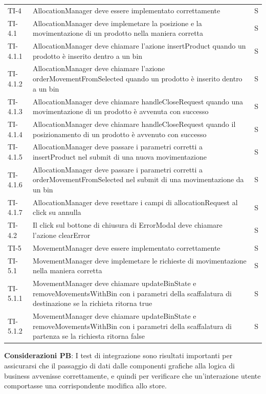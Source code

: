 \begin{xltabular}{0.9\textwidth}{X | p{0.6\textwidth}  | p{0.1\textwidth}}
    TI-4 & AllocationManager deve essere implementato correttamente & S\\
    TI-4.1 & AllocationManager deve implemetare la posizione e la movimentazione di un prodotto nella maniera corretta & S\\
    TI-4.1.1 & AllocationManager deve chiamare l'azione insertProduct quando un prodotto è inserito dentro a un bin & S\\
    TI-4.1.2 & AllocationManager deve chiamare l'azione orderMovementFromSelected quando un prodotto è inserito dentro a un bin & S\\
    TI-4.1.3 & AllocationManager deve chiamare handleCloseRequest quando una movimentazione di un prodotto è avvenuta con successo  & S\\
    TI-4.1.4 & AllocationManager deve chiamare handleCloseRequest quando il posizionamento di un prodotto è avvenuto con successo & S\\
    TI-4.1.5 & AllocationManager deve passare i parametri corretti a insertProduct nel submit di una nuova movimentazione & S\\
    TI-4.1.6 & AllocationManager deve passare i parametri corretti a orderMovementFromSelected nel submit di una movimentazione da un bin & S\\
    TI-4.1.7 & AllocationManager deve resettare i campi di allocationRequest al click su annulla & S\\
    TI-4.2 & Il click sul bottone di chiusura di ErrorModal deve chiamare l'azione clearError & S\\
    
    TI-5 & MovementManager deve essere implementato correttamente & S\\
    TI-5.1 & MovementManager deve implemetare le richieste di movimentazione nella maniera corretta & S\\
    TI-5.1.1 & MovementManager deve chiamare updateBinState e removeMovementsWithBin con i parametri della scaffalatura di destinazione se la richieta ritorna true & S\\
    TI-5.1.2 & MovementManager deve chiamare updateBinState e removeMovementsWithBin con i parametri della scaffalatura di partenza se la richiesta ritorna false & S\\
\end{xltabular}

\vspace{0.2cm} \noindent\textbf{Considerazioni PB}: I test di integrazione sono risultati importanti per assicurarsi che il passaggio di dati dalle componenti grafiche alla logica di business avvenisse correttamente, e quindi per verificare che un'interazione utente comportasse una corrispondente modifica allo store.

